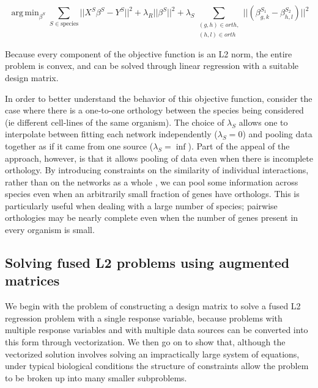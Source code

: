 \documentclass[11pt]{article}
\DeclareMathOperator*{\argmin}{arg\,min}
\begin{document}
\begin{equation}
\argmin_{\beta^S} \displaystyle\sum_{S \in \text{species}} \vert \vert X^S\beta^S - Y^S \vert \vert ^2 + \lambda_R \vert \vert \beta^S \vert \vert ^2 + \displaystyle \lambda_S \sum_{\substack{(g,h) \in orth,\\
 (h,l) \in orth}} \vert \vert (\beta^{S_1}_{g,k} - \beta^{S_2}_{h,l}) \vert \vert ^2
\end{equation}

Because every component of the objective function is an L2 norm, the entire problem is convex, and can be solved through linear regression with a suitable design matrix. %

In order to better understand the behavior of this objective function, consider the case where there is a one-to-one orthology between the species being considered (ie different cell-lines of the same organism). The choice of $\lambda_S$ allows one to interpolate between fitting each network independently ($\lambda_S=0$) and pooling data together as if it came from one source ($\lambda_S=\inf$). Part of the appeal of the approach, however, is that it allows pooling of data even when there is incomplete orthology. By introducing constraints on the similarity of individual interactions, rather than on the networks as a whole \cite{liu2011temporal}, we can pool some information across species even when an arbitrarily small fraction of genes have orthologs. This is particularly useful when dealing with a large number of species; pairwise orthologies may be nearly complete even when the number of genes present in every organism is small. 


\subsection{Solving fused L2 problems using augmented matrices}
We begin with the problem of constructing a design matrix to solve a fused L2 regression problem with a single response variable, because problems with multiple response variables and with multiple data sources can be converted into this form through vectorization. We then go on to show that, although the vectorized solution involves solving an impractically large system of equations, under typical biological conditions the structure of constraints allow the problem to be broken up into many smaller subproblems. 
\end{document}
